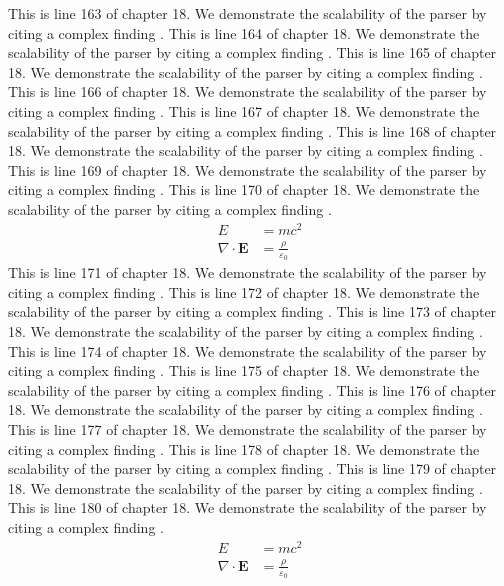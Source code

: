 This is line 163 of chapter 18. We demonstrate the scalability of the parser by citing a complex finding \cite{ref18_163}.
This is line 164 of chapter 18. We demonstrate the scalability of the parser by citing a complex finding \cite{ref18_164}.
This is line 165 of chapter 18. We demonstrate the scalability of the parser by citing a complex finding \cite{ref18_165}.
This is line 166 of chapter 18. We demonstrate the scalability of the parser by citing a complex finding \cite{ref18_166}.
This is line 167 of chapter 18. We demonstrate the scalability of the parser by citing a complex finding \cite{ref18_167}.
This is line 168 of chapter 18. We demonstrate the scalability of the parser by citing a complex finding \cite{ref18_168}.
This is line 169 of chapter 18. We demonstrate the scalability of the parser by citing a complex finding \cite{ref18_169}.
This is line 170 of chapter 18. We demonstrate the scalability of the parser by citing a complex finding \cite{ref18_170}.
\begin{align*}
  E &= mc^2 \\
  \nabla \cdot \mathbf{E} &= \frac{\rho}{\varepsilon_0}
\end{align*}
This is line 171 of chapter 18. We demonstrate the scalability of the parser by citing a complex finding \cite{ref18_171}.
This is line 172 of chapter 18. We demonstrate the scalability of the parser by citing a complex finding \cite{ref18_172}.
This is line 173 of chapter 18. We demonstrate the scalability of the parser by citing a complex finding \cite{ref18_173}.
This is line 174 of chapter 18. We demonstrate the scalability of the parser by citing a complex finding \cite{ref18_174}.
This is line 175 of chapter 18. We demonstrate the scalability of the parser by citing a complex finding \cite{ref18_175}.
This is line 176 of chapter 18. We demonstrate the scalability of the parser by citing a complex finding \cite{ref18_176}.
This is line 177 of chapter 18. We demonstrate the scalability of the parser by citing a complex finding \cite{ref18_177}.
This is line 178 of chapter 18. We demonstrate the scalability of the parser by citing a complex finding \cite{ref18_178}.
This is line 179 of chapter 18. We demonstrate the scalability of the parser by citing a complex finding \cite{ref18_179}.
This is line 180 of chapter 18. We demonstrate the scalability of the parser by citing a complex finding \cite{ref18_180}.
\begin{align*}
  E &= mc^2 \\
  \nabla \cdot \mathbf{E} &= \frac{\rho}{\varepsilon_0}
\end{align*}
